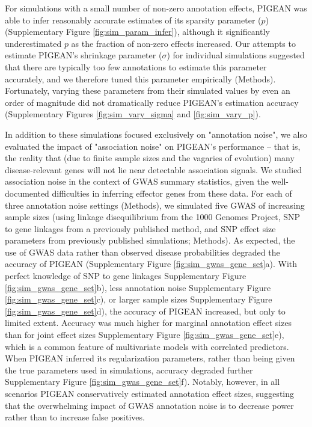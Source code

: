 For simulations with a small number of non-zero annotation effects, PIGEAN was able to infer reasonably accurate estimates of its sparsity parameter ($p$) (Supplementary Figure \ref{fig:sim_param_infer}), although it significantly underestimated $p$ as the fraction of non-zero effects increased. Our attempts to estimate PIGEAN's shrinkage parameter ($\sigma$) for individual simulations suggested that there are typically too few annotations  to estimate this parameter accurately, and we therefore tuned this parameter empirically (Methods). Fortunately, varying these parameters from their simulated values by even an order of magnitude did not dramatically reduce PIGEAN's estimation accuracy (Supplementary Figures \ref{fig:sim_vary_sigma} and \ref{fig:sim_vary_p}).

In addition to these simulations focused exclusively on "annotation noise", we also evaluated the impact of  "association noise" on PIGEAN's performance -- that is, the reality that (due to finite sample sizes and the vagaries of evolution) many disease-relevant genes will not lie near detectable association signals. We studied association noise in the context of GWAS summary statistics, given the well-documented difficulties in inferring effector genes from these data. For each of three annotation noise settings (Methods), we simulated five GWAS of increasing sample sizes (using linkage disequilibrium from the 1000 Genomes Project, SNP to gene linkages from a previously published method, and SNP effect size parameters from previously published simulations; Methods). As expected, the use of GWAS data rather than observed disease probabilities degraded the accuracy of PIGEAN (Supplementary Figure \ref{fig:sim_gwas_gene_set}a). With perfect knowledge of SNP to gene linkages Supplementary Figure \ref{fig:sim_gwas_gene_set}b), less annotation noise Supplementary Figure \ref{fig:sim_gwas_gene_set}c), or larger sample sizes Supplementary Figure \ref{fig:sim_gwas_gene_set}d), the accuracy of PIGEAN increased, but only to limited extent. Accuracy was much higher for marginal annotation effect sizes than for joint effect sizes Supplementary Figure \ref{fig:sim_gwas_gene_set}e), which is a common feature of multivariate models with correlated predictors. When PIGEAN inferred its regularization parameters, rather than being given the true parameters used in simulations, accuracy degraded further Supplementary Figure \ref{fig:sim_gwas_gene_set}f). Notably, however, in all scenarios PIGEAN conservatively estimated annotation effect sizes, suggesting that the overwhelming impact of GWAS annotation noise is to decrease power rather than to increase false positives.

